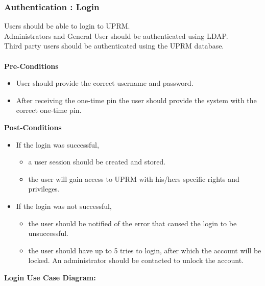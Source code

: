 \subsubsection{Authentication : Login}
Users should be able to login to UPRM.\\
Administrators and General User should be authenticated using LDAP. \\
Third party users should be authenticated using the UPRM database.\\ \\
\textbf{Pre-Conditions}
\begin{itemize}
	\item User should provide the correct username and password.
	\item After receiving the one-time pin the user should provide the system with the correct one-time pin.\\
\end{itemize}
\textbf{Post-Conditions}
\begin{itemize}
	\item If the login was successful,
		\begin{itemize}
			\item a user session should be created and stored.
			\item the user will gain access to UPRM with his/hers specific rights and privileges.
		\end{itemize} 
	\item If the login was not successful,
			\begin{itemize}
				\item the user should be notified of the error that caused the login to be unsuccessful.
				\item the user should have up to 5 tries to login, after which the account will be locked. An administrator should be contacted to unlock the account. \\
			\end{itemize} 
\end{itemize}
\textbf{Login Use Case Diagram:}\\
\centerline{}

